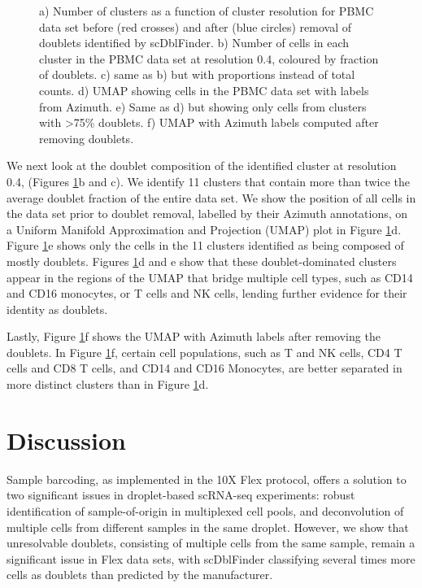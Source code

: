 \documentclass[unnumsec,webpdf,modern,large]{oup-authoring-template}
\begin{document}
\begin{figure}
\begin{center}
			\caption{ 
				a) Number of clusters as a function of cluster resolution for PBMC data set before (red crosses) and after (blue circles) removal of doublets identified by scDblFinder. 
				b) Number of cells in each cluster in the PBMC data set at resolution 0.4, coloured by fraction of doublets. 
				c) same as b) but with proportions instead of total counts. 
				d) UMAP showing cells in the PBMC data set with labels from Azimuth. 
				e) Same as d) but showing only cells from clusters with >75\% doublets. 
				f) UMAP with Azimuth labels computed after removing doublets.
				}
			\label{fig:doublet_clusters}
		\end{center}	
	\end{figure} 
		
	We next look at the doublet composition of the identified cluster at resolution 0.4, (Figures \ref{fig:doublet_clusters}b and c). 
	We identify 11 clusters that contain more than twice the average doublet fraction of the entire data set. 
	 We show the position of all cells in the data set prior to doublet removal, labelled by their Azimuth annotations, on a Uniform Manifold Approximation and Projection (UMAP) plot in Figure \ref{fig:doublet_clusters}d. 
	 Figure \ref{fig:doublet_clusters}e shows only the cells in the 11 clusters identified as being composed of mostly doublets.
	 Figures \ref{fig:doublet_clusters}d and e show that these doublet-dominated clusters appear in the regions of the UMAP that bridge multiple cell types, such as CD14 and CD16 monocytes, or T cells and NK cells, lending further evidence for their identity as doublets. 
	 
	 Lastly, Figure  \ref{fig:doublet_clusters}f shows the UMAP with Azimuth labels after removing the doublets. 
	 In Figure  \ref{fig:doublet_clusters}f, certain cell populations, such as T and NK cells, CD4 T cells and CD8 T cells, and CD14 and CD16 Monocytes, are better separated in more distinct clusters than in Figure  \ref{fig:doublet_clusters}d.
	
	\section{Discussion}
	\label{sec:discussion}
	
	Sample barcoding, as implemented in the 10X Flex protocol, offers a solution to two significant issues in droplet-based scRNA-seq experiments: robust identification of sample-of-origin in multiplexed cell pools, and deconvolution of multiple cells from different samples in the same droplet. 
	However, we show that unresolvable doublets, consisting of multiple cells from the same sample, remain a significant issue in Flex data sets, with scDblFinder classifying several times more cells as doublets than predicted by the manufacturer. 
		
\end{document}
